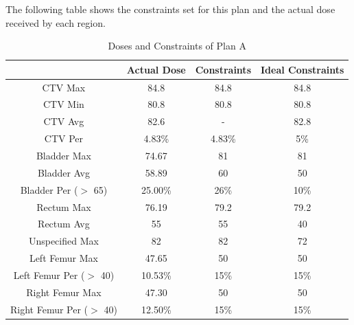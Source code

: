\documentclass{report}
\begin{document}
The following table shows the constraints set for this plan and the actual dose received by each region.
\begin{table}[H]
\centering
\begin{tabular}{||c|c c c||} 
 \hline
  & Actual Dose & Constraints & Ideal Constraints \\ [0.5ex] 
 \hline
 CTV Max & 84.8 & 84.8 & 84.8 \\ 
 CTV Min & 80.8 & 80.8 & 80.8 \\
 CTV Avg & 82.6 & - & 82.8 \\
 CTV Per & 4.83\% & 4.83\% & 5\% \\
 \hline
 Bladder Max & 74.67 & 81 & 81 \\
 Bladder Avg & 58.89 & 60 & 50 \\
 Bladder Per ($>$ 65) & 25.00\% & 26\% & 10\% \\ 
 \hline
 Rectum Max & 76.19 & 79.2 & 79.2 \\ 
 Rectum Avg & 55 & 55 & 40 \\ 
 \hline
 Unspecified Max & 82 & 82 & 72 \\ 
 \hline
 Left Femur Max& 47.65 & 50 & 50 \\ 
 Left Femur Per ($>$ 40)& 10.53\% & 15\% & 15\% \\ 
 \hline
 Right Femur Max& 47.30 & 50 & 50 \\ 
 Right Femur Per ($>$ 40)& 12.50\% & 15\% & 15\% \\ 
 \hline
\end{tabular}
\caption{Doses and Constraints of Plan A}
\label{table:1}
\end{table}
\end{document}
